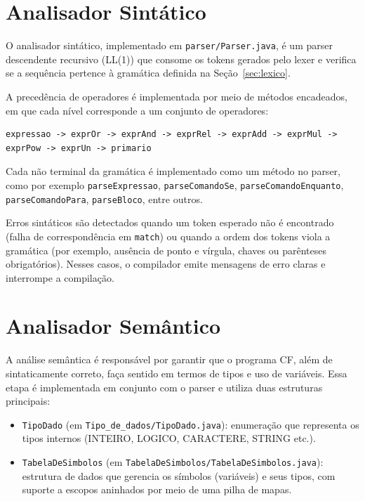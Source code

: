 \documentclass[12pt,a4paper]{article}
\begin{document}
\section{Analisador Sintático}
\label{sec:sintatico}

O analisador sintático, implementado em \texttt{parser/Parser.java}, é um parser descendente recursivo (LL(1)) que consome os tokens gerados pelo lexer e verifica se a sequência pertence à gramática definida na Seção~\ref{sec:lexico}.

A precedência de operadores é implementada por meio de métodos encadeados, em que cada nível corresponde a um conjunto de operadores:

\begin{verbatim}
expressao -> exprOr -> exprAnd -> exprRel -> exprAdd -> exprMul -> exprPow -> exprUn -> primario
\end{verbatim}

Cada não terminal da gramática é implementado como um método no parser, como por exemplo \texttt{parseExpressao}, \texttt{parseComandoSe}, \texttt{parseComandoEnquanto}, \texttt{parseComandoPara}, \texttt{parseBloco}, entre outros.

Erros sintáticos são detectados quando um token esperado não é encontrado (falha de correspondência em \texttt{match}) ou quando a ordem dos tokens viola a gramática (por exemplo, ausência de ponto e vírgula, chaves ou parênteses obrigatórios). Nesses casos, o compilador emite mensagens de erro claras e interrompe a compilação.

\section{Analisador Semântico}
\label{sec:semantico}

A análise semântica é responsável por garantir que o programa CF, além de sintaticamente correto, faça sentido em termos de tipos e uso de variáveis. Essa etapa é implementada em conjunto com o parser e utiliza duas estruturas principais:

\begin{itemize}
  \item \texttt{TipoDado} (em \texttt{Tipo\_de\_dados/TipoDado.java}): enumeração que representa os tipos internos (INTEIRO, LOGICO, CARACTERE, STRING etc.).
  \item \texttt{TabelaDeSimbolos} (em \texttt{TabelaDeSimbolos/TabelaDeSimbolos.java}): estrutura de dados que gerencia os símbolos (variáveis) e seus tipos, com suporte a escopos aninhados por meio de uma pilha de mapas.
\end{itemize}
\end{document}
